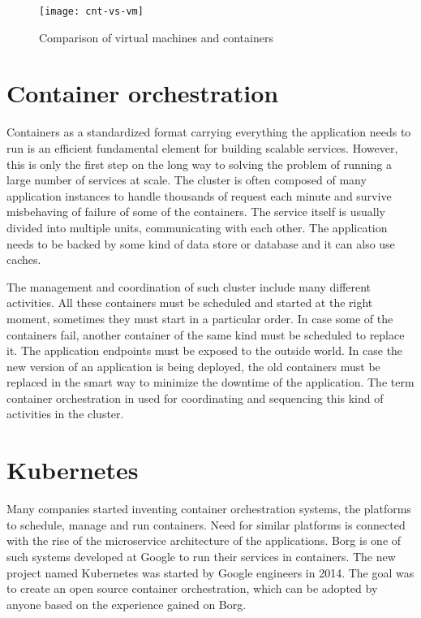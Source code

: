 \documentclass[
  digital, %
  twoside, %
  table,   %
  lof,     %
  lot,     %
]{fithesis3}
\begin{document}
\begin{figure}[H]
\caption{Comparison of virtual machines and containers}
\centering
\texttt{[image: cnt-vs-vm]}
\label{fig:cnt-vs-vm}
\end{figure}

\section{Container orchestration} \label{sec:orchestration}
Containers as a standardized format carrying everything the application needs to run is an efficient fundamental element for building scalable services. However, this is only the first step on the long way to solving the problem of running a large number of services at scale. The cluster is often composed of many application instances to handle thousands of request each minute and survive misbehaving of failure of some of the containers. The service itself is usually divided into multiple units, communicating with each other. The application needs to be backed by some kind of data store or database and it can also use caches.

The management and coordination of such cluster include many different activities. All these containers must be scheduled and started at the right moment, sometimes they must start in a particular order. In case some of the containers fail, another container of the same kind must be scheduled to replace it. The application endpoints must be exposed to the outside world. In case the new version of an application is being deployed, the old containers must be replaced in the smart way to minimize the downtime of the application. The term container orchestration in used for coordinating and sequencing this kind of activities in the cluster.

\section{Kubernetes} \label{sec:k8s}
Many companies started inventing container orchestration systems, the platforms to schedule, manage and run containers. Need for similar platforms is connected with the rise of the microservice architecture of the applications. Borg \cite{borg} is one of such systems developed at Google to run their services in containers. The new project named Kubernetes was started by Google engineers in 2014. The goal was to create an open source container orchestration, which can be adopted by anyone based on the experience gained on Borg.
\end{document}
